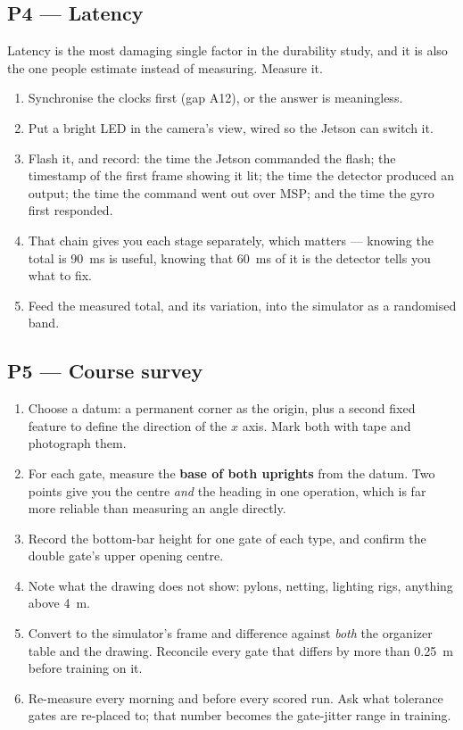 \subsection{P4 --- Latency}
Latency is the most damaging single factor in the durability study, and it is also the one people
estimate instead of measuring. Measure it.
\begin{enumerate}
\item Synchronise the clocks first (gap A12), or the answer is meaningless.
\item Put a bright LED in the camera's view, wired so the Jetson can switch it.
\item Flash it, and record: the time the Jetson commanded the flash; the timestamp of the first frame
showing it lit; the time the detector produced an output; the time the command went out over MSP; and
the time the gyro first responded.
\item That chain gives you each stage separately, which matters --- knowing the total is \SI{90}{ms}
is useful, knowing that \SI{60}{ms} of it is the detector tells you what to fix.
\item Feed the measured total, and its variation, into the simulator as a randomised band.
\end{enumerate}

\subsection{P5 --- Course survey}
\begin{enumerate}
\item Choose a datum: a permanent corner as the origin, plus a second fixed feature to define the
direction of the $x$ axis. Mark both with tape and photograph them.
\item For each gate, measure the \textbf{base of both uprights} from the datum. Two points give you
the centre \emph{and} the heading in one operation, which is far more reliable than measuring an
angle directly.
\item Record the bottom-bar height for one gate of each type, and confirm the double gate's upper
opening centre.
\item Note what the drawing does not show: pylons, netting, lighting rigs, anything above \SI{4}{m}.
\item Convert to the simulator's frame and difference against \emph{both} the organizer table and the
drawing. Reconcile every gate that differs by more than \SI{0.25}{m} before training on it.
\item Re-measure every morning and before every scored run. Ask what tolerance gates are re-placed
to; that number becomes the gate-jitter range in training.
\end{enumerate}

